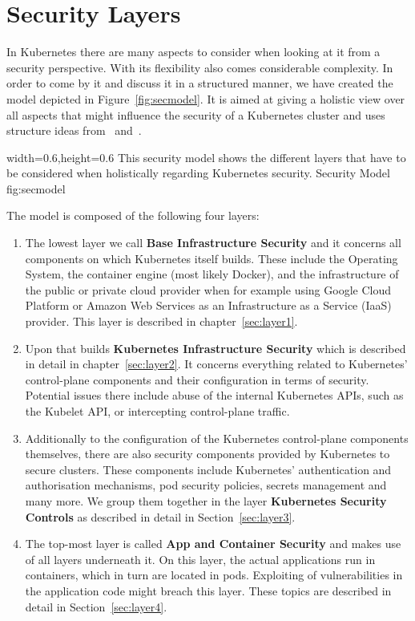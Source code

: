 \chapter{Security Layers}

In Kubernetes there are many aspects to consider when looking at it from a security perspective. With its flexibility also comes considerable complexity. In order to come by it and discuss it in a structured manner, we have created the model depicted in Figure~\ref{fig:secmodel}. It is aimed at giving a holistic view over all aspects that might influence the security of a Kubernetes cluster and uses structure ideas from~\textcite{securingkubernetes} and~\textcite{kubernetessecurity}.

  {width=0.6\textwidth,height=0.6\textheight}%
  {This security model shows the different layers that have to be considered when holistically regarding Kubernetes security.}%
  {Security Model}%
  {fig:secmodel}%

The model is composed of the following four layers:

\begin{enumerate}
    \item The lowest layer we call \textbf{Base Infrastructure Security} and it concerns all components on which Kubernetes itself builds. These include the Operating System, the container engine (most likely Docker), and the infrastructure of the public or private cloud provider when for example using Google Cloud Platform or Amazon Web Services as an Infrastructure as a Service (IaaS) provider. This layer is described in chapter~\ref{sec:layer1}.
    \item Upon that builds \textbf{Kubernetes Infrastructure Security} which is described in detail in chapter~\ref{sec:layer2}. It concerns everything related to Kubernetes' control-plane components and their configuration in terms of security. Potential issues there include abuse of the internal Kubernetes APIs, such as the Kubelet API, or intercepting control-plane traffic.
    \item Additionally to the configuration of the Kubernetes control-plane components themselves, there are also security components provided by Kubernetes to secure clusters. These components include Kubernetes' authentication and authorisation mechanisms, pod security policies, secrets management and many more. We group them together in the layer \textbf{Kubernetes Security Controls} as described in detail in Section~\ref{sec:layer3}.
    \item The top-most layer is called \textbf{App and Container Security} and makes use of all layers underneath it. On this layer, the actual applications run in containers, which in turn are located in pods. Exploiting of vulnerabilities in the application code might breach this layer. These topics are described in detail in Section~\ref{sec:layer4}.
\end{enumerate}

